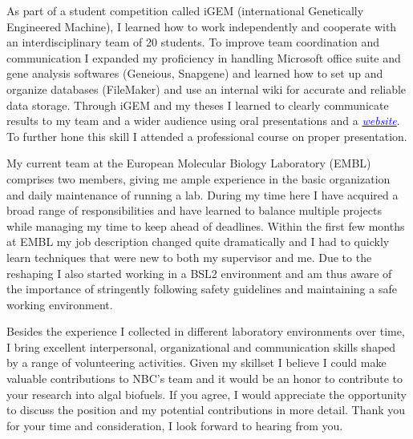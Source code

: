 \documentclass[11pt,a4paper,sans]{moderncv}
\begin{document}
\begin{spacing}{1.15}
As part of a student competition called iGEM (international Genetically Engineered Machine), I learned how to work independently and cooperate with an interdisciplinary team of 20 students. To improve team coordination and communication I expanded my proficiency in handling Microsoft office suite and gene analysis softwares (Geneious, Snapgene) and learned how to set up and organize databases (FileMaker) and use an internal wiki for accurate and reliable data storage. Through iGEM and my theses I learned to clearly communicate results to my team and a wider audience using oral presentations and a {\href{http://2015.igem.org/Team:Freiburg}{\textcolor{blue}{\textit{website}}}}. To further hone this skill I attended a professional course on proper presentation.\par\vspace*{1mm}

My current team at the European Molecular Biology Laboratory (EMBL) comprises two members, giving me ample experience in the basic organization and daily maintenance of running a lab. During my time here I have acquired a broad range of responsibilities and have learned to balance multiple projects while managing my time to keep ahead of deadlines. Within the first few months at EMBL my job description changed quite dramatically and I had to quickly learn techniques that were new to both my supervisor and me. Due to the reshaping I also started working in a BSL2 environment and am thus aware of the importance of stringently following safety guidelines and maintaining a safe working environment.\par\vspace*{1mm}

Besides the experience I collected in different laboratory environments over time, I bring excellent interpersonal, organizational and communication skills shaped by a range of volunteering activities. Given my skillset I believe I could make valuable contributions to NBC's team and it would be an honor to contribute to your research into algal biofuels. If you agree, I would appreciate the opportunity to discuss the position and my potential contributions in more detail. Thank you for your time and consideration, I look forward to hearing from you.


 

\end{spacing}
\makeletterclosing
\end{document}

